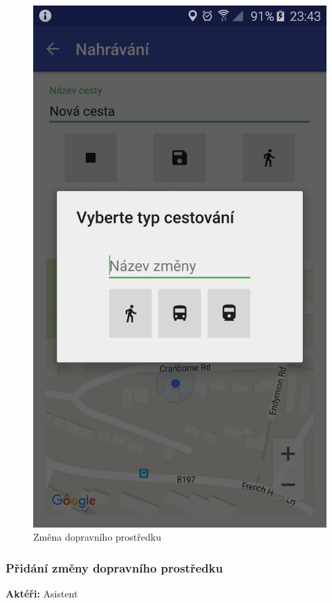 \documentclass[czech,master,public,dept460,male,java,cpdeclaration]{diploma}
\newcommand{\usecase}[2]{\subsubsection{#1}\label{#2}}
\begin{document}
\begin{figure}[H]
\begin{minipage}{.5\textwidth}
                  \includegraphics[scale=0.14]{img/screen/zmenaprostredku.png}
          \caption{Změna dopravního prostředku}
          \label{fig:pridanizmenyprostredku}

       \end{minipage}
\end{figure}

\usecase{Přidání změny dopravního prostředku}{pridanizmenyprostredku}
\textbf{Aktéři:} Asistent
\end{document}
